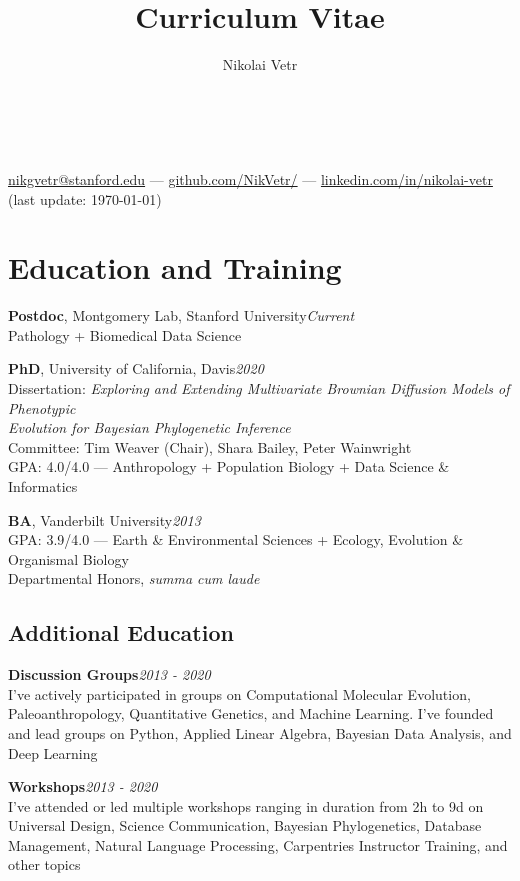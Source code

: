 \documentclass[12pt]{article}
\makeatletter
\newcommand{\cvcolor}{\color{DarkRed}} %
\renewcommand{\maketitle}{
\begin{center}

{\Huge\theauthor}\\
\vspace{0.25em}
{\Large \cvcolor{Stanford University, California}}\\

\href{mailto:nikgvetr@stanford.edu}{nikgvetr@stanford.edu} --- \href{https://www.github.com/NikVetr/}{github.com/NikVetr/} --- \href{https://www.linkedin.com/in/nikolai-vetr}{linkedin.com/in/nikolai-vetr}\\

{\color{Gray}(last update: \today)}
\end{center}
}
\makeatother
\begin{document}
\title{Curriculum Vitae} %
\author{Nikolai Vetr}

\maketitle

\vspace{-1.5em}

\section{Education and Training}

\textbf{Postdoc}, Montgomery Lab, Stanford University\hfill\emph{Current}\\
Pathology + Biomedical Data Science
\vspace{-0.25em}

\textbf{PhD}, University of California, Davis\hfill\emph{2020}\\
Dissertation: \textit{Exploring and Extending Multivariate Brownian Diffusion Models of Phenotypic\\
\hspace*{22mm} Evolution for Bayesian Phylogenetic Inference}\\
Committee: Tim Weaver (Chair), Shara Bailey, Peter Wainwright\\
GPA: 4.0/4.0 — Anthropology + Population Biology + Data Science \& Informatics

\textbf{BA}, Vanderbilt University\hfill\emph{2013}\\
GPA: 3.9/4.0 — Earth \& Environmental Sciences + Ecology, Evolution \& Organismal Biology\\
Departmental Honors, \textit{summa cum laude}\\
\vspace{-1.25em}
\subsection{Additional Education}

\textbf{Discussion Groups}\hfill\emph{2013 - 2020}\\
I've actively participated in groups on Computational Molecular Evolution, Paleoanthropology, Quantitative Genetics, and Machine Learning. I've founded and lead groups on Python, Applied Linear Algebra, Bayesian Data Analysis, and Deep Learning

\textbf{Workshops}\hfill\emph{2013 - 2020}\\
I've attended or led multiple workshops ranging in duration from 2h to 9d on Universal Design, Science Communication, Bayesian Phylogenetics, Database Management, Natural Language Processing, Carpentries Instructor Training, and other topics
\end{document}
